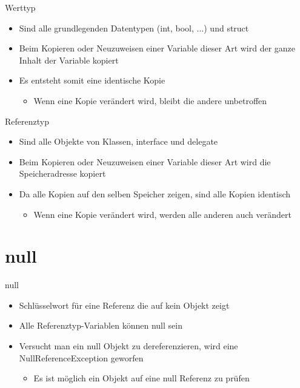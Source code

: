 \begin{frame}{Werttyp}
	\begin{itemize}
		\item Sind alle grundlegenden Datentypen (\alert{int}, \alert{bool}, ...) und \alert{struct}
	\end{itemize}
	\begin{itemize}
		\item Beim Kopieren oder Neuzuweisen einer Variable dieser Art wird der ganze Inhalt der Variable kopiert
		\item Es entsteht somit eine identische Kopie
		\begin{itemize}
			\item Wenn eine Kopie verändert wird, bleibt die andere unbetroffen
		\end{itemize}
	\end{itemize}
		
\end{frame}

\begin{frame}{Referenztyp}
	\begin{itemize}
		\item Sind alle Objekte von Klassen, \alert{interface} und \alert{delegate}
	\end{itemize}
	\begin{itemize}
		\item Beim Kopieren oder Neuzuweisen einer Variable dieser Art wird die Speicheradresse kopiert
		\item Da alle Kopien auf den selben Speicher zeigen, sind alle Kopien identisch
		\begin{itemize}
			\item Wenn eine Kopie verändert wird, werden alle anderen auch verändert
		\end{itemize}
	\end{itemize}
		
\end{frame}

\section{null}
\begin{frame}{null}
	\begin{itemize}
		\item Schlüsselwort für eine Referenz die auf kein Objekt zeigt
		\item Alle Referenztyp-Variablen können \alert{null} sein
		\item Versucht man ein \alert{null} Objekt zu dereferenzieren, wird eine \alert{NullReferenceException} geworfen 
		\begin{itemize}
			\item Es ist möglich ein Objekt auf eine \alert{null} Referenz zu prüfen
		\end{itemize}
	\end{itemize}
		
\end{frame}



